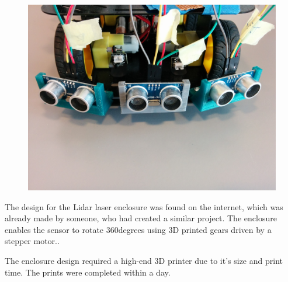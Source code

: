 \begin{figure}[H]
	\centering
	\includegraphics[width=.6\linewidth]{images/mounted_ultrasonic_sensors.jpg}
\end{figure}
The design for the Lidar laser enclosure was found on the internet, which was already made by someone, who had created a similar project. The enclosure enables the sensor to rotate 360degrees using 3D printed gears driven by a stepper motor.\cite{lidarenclosure}.

The enclosure design required a high-end 3D printer due to it's size and print time. The prints were completed within a day.


